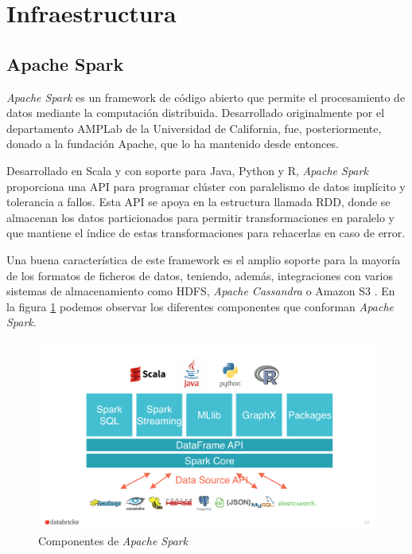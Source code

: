 \clearpage

\section{Infraestructura}
\subsection{Apache Spark \label{sparkEA}}
\textit{Apache Spark} \cite{spark} es un \gls{framework} de código abierto que permite el procesamiento de datos mediante la computación distribuida. Desarrollado originalmente por el departamento AMPLab \cite{amplab} de la Universidad de California, fue, posteriormente, donado a la fundación Apache, que lo ha mantenido desde entonces. 

Desarrollado en Scala \cite{scala} y con soporte para Java, Python y R, \textit{Apache Spark} proporciona una \gls{API} para programar clúster con paralelismo de datos implícito y tolerancia a fallos. Esta \gls{API} se apoya en la estructura llamada \gls{RDD}, donde se almacenan los datos particionados para permitir transformaciones en paralelo y que mantiene el índice de estas transformaciones para rehacerlas en caso de error.

Una buena característica de este \gls{framework} es el amplio soporte para la mayoría de los formatos de ficheros de datos, teniendo, además, integraciones con varios sistemas de almacenamiento como \gls{HDFS}, \textit{Apache Cassandra} \cite{cassandra} o Amazon S3 \cite{aws}. En la figura \ref{partSpark} podemos observar los diferentes componentes que conforman \textit{Apache Spark}.

\begin{figure}[htp!]
	\centering
	\caption{Componentes de \textit{Apache Spark} \cite{partsSpark}}
	\label{partSpark}
	\vspace{5pt}
	\includegraphics[scale=0.3]{graphics/partSpark}
\end{figure}

